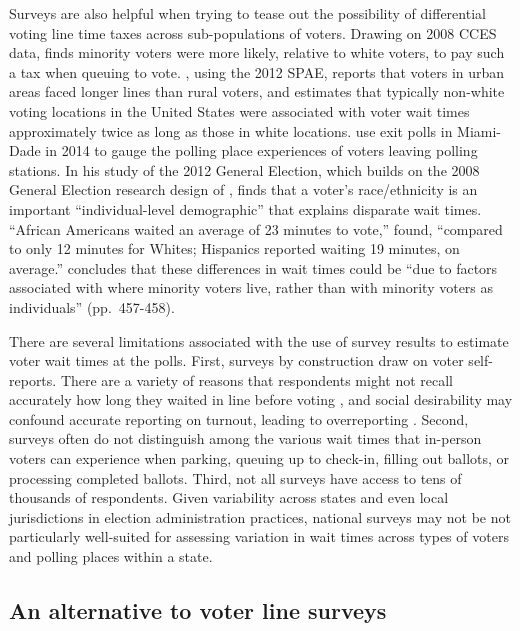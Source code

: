 \documentclass[12pt,titlepage]{article}
\begin{document}
Surveys are also helpful when trying to tease out the possibility of
differential voting line time taxes across sub-populations of voters.
Drawing on 2008 CCES data, \cite{mukherjee:timetax} finds minority
voters were more likely, relative to white voters, to pay such a tax
when queuing to vote. \citet{kimball:voting}, using the 2012 SPAE,
reports that voters in urban areas faced longer lines than rural
voters, and \citet{pettigrew:racegapwaittimes} estimates that
typically non-white voting locations in the United States were
associated with voter wait times approximately twice as long as those
in white locations.  \cite{herron:confidence} use exit polls in
Miami-Dade in 2014 to gauge the polling place experiences of voters
leaving polling stations.  In his study of the 2012 General Election,
which builds on the 2008 General Election research design of
\citet{alvarez:survey}, \cite{stewart:waitingtovote2012} finds that a
voter's race/ethnicity is an important ``individual-level
demographic'' that explains disparate wait times.  ``African Americans
waited an average of 23 minutes to vote,''
\citeauthor{stewart:waitingtovote2012} found, ``compared to only 12
minutes for Whites; Hispanics reported waiting 19 minutes, on
average.''  \citeauthor{stewart:waitingtovote2012} concludes that
these differences in wait times could be ``due to factors associated
with where minority voters live, rather than with minority voters as
individuals'' (pp.\ 457-458).

There are several limitations associated with the use of survey
results to estimate voter wait times at the polls. First, surveys by
construction draw on voter self-reports.  There are a variety of
reasons that respondents might not recall accurately how long they
waited in line before voting \citep[e.g.,][]{sackettetal:timeflies},
and social desirability may confound accurate reporting on turnout,
leading to overreporting \citep{ansolhersh:bigdata}.  Second, surveys
often do not distinguish among the various wait times that in-person
voters can experience when parking, queuing up to check-in, filling
out ballots, or processing completed ballots. Third, not all surveys
have access to tens of thousands of respondents.  Given variability
across states and even local jurisdictions in election administration
practices, national surveys may not be not particularly well-suited
for assessing variation in wait times across types of voters and
polling places within a state.

\subsection*{An alternative to voter line surveys}
\end{document}
